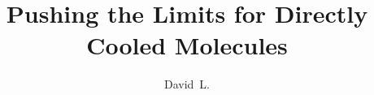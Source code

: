 \documentclass[defaultstyle,11pt]{thesis}
\title{Pushing the Limits for Directly Cooled Molecules}
\author{David~L.}{Reens}
\begin{document}
\def\justbeingincluded{justbeingincluded}












\appendix


\end{document}
